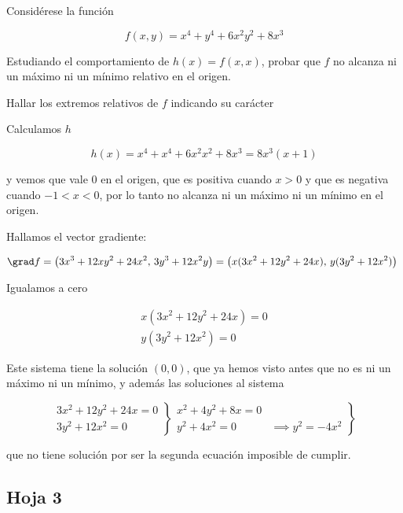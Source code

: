 \begin{problem}[14] Considérese la función 

\[ f(x,y) = x^4 + y^4 + 6x^2y^2 + 8 x^3 \]

\ppart Estudiando el comportamiento de $h(x)=f(x,x)$, probar que $f$ no alcanza ni un máximo ni un mínimo relativo en el origen. 

\ppart Hallar los extremos relativos de $f$ indicando su carácter

\solution

\spart Calculamos $h$

\[ h(x) = x^4 + x^4 + 6x^2x^2 + 8 x^3 = 8x^3(x + 1) \]

y vemos que vale $0$ en el origen, que es positiva cuando $x>0$ y que es negativa cuando $-1<x<0$, por lo tanto no alcanza ni un máximo ni un mínimo en el origen.

\spart Hallamos el vector gradiente:

\[ \grad f = \left(3x^3 + 12xy^2 + 24x^2,\, 3y^3 + 12x^2y\right) = \left(x(3x^2 + 12y^2 + 24x),\, y(3y^2+12x^2)\right) \]

Igualamos a cero

\[ \left.\begin{matrix}
x(3x^2 + 12y^2 + 24x) = 0 \\
y(3y^2+12x^2) = 0  
\end{matrix}\right. \]

Este sistema tiene la solución $(0,0)$, que ya hemos visto antes que no es ni un máximo ni un mínimo, y además las soluciones al sistema 

\[ \left.\begin{matrix} 3x^2 + 12y^2 + 24x = 0 \\
3y^2 +12x^2 = 0
\end{matrix}\right\} 
\left.\begin{matrix} x^2 + 4y^2 + 8x = 0 &  \\
y^2 +4x^2 = 0 & \implies y^2 = -4x^2 
\end{matrix}\right\}  \]

que no tiene solución por ser la segunda ecuación imposible de cumplir.
\end{problem}

\subsection{Hoja 3}

